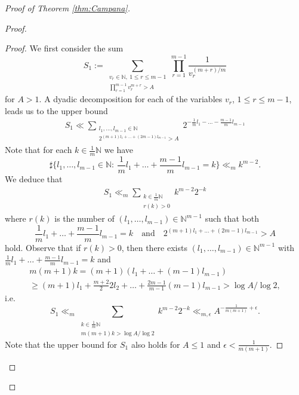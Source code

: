 \documentclass[10pt, a4paper, reqno, english]{amsart}
\theoremstyle{definition}
\numberwithin{theorem}{section}
\numberwithin{equation}{section}
\begin{document}
\begin{proof}[Proof of Theorem \ref{thm:Campana}]
\begin{proof}
\begin{proof}
We first consider the sum
$$S_1:=  \sum_{\substack{ v_{r}\in \mathbb{N},\ 1\leq r\leq m-1\\\prod_{r=1}^{m-1} v_{r}^{m+r}>A }} \prod_{r=1}^{m-1}\frac{1}{ v_{r}^{(m+r)/m}}$$
for $A>1$. A dyadic decomposition for each of the variables $v_r$, $1\leq r\leq m-1$, leads us to the upper bound
\begin{gather*}
S_1\ll \sum_{\substack{l_1,\ldots, l_{m-1}\in \mathbb{N}\\ 2^{(m+1)l_1+\ldots + (2m-1)l_{m-1}}>A}} 2^{-\frac{1}{m}l_1-\ldots - \frac{m-1}{m} l_{m-1}} 
\end{gather*}
Note that for each $k\in \frac{1}{m}\mathbb{N}$ we have
$$\sharp\{l_1,\ldots, l_{m-1}\in \mathbb{N}:\ \frac{1}{m}l_1+\ldots + \frac{m-1}{m} l_{m-1}=k\}\ll_m k^{m-2}.$$
We deduce that
\begin{gather*}
S_1\ll_m \sum_{\substack{k\in \frac{1}{m}\mathbb{N}\\ r(k)>0}} k^{m-2} 2^{-k} 
\end{gather*}
where $r(k)$ is the number of $(l_1,\ldots, l_{m-1})\in \mathbb{N}^{m-1}$ such that both $$\frac{1}{m}l_1+\ldots + \frac{m-1}{m} l_{m-1}=k \quad \mbox{and}\quad 2^{(m+1)l_1+\ldots + (2m-1)l_{m-1}}>A$$ hold. Observe that if $r(k)>0$, then there exists $(l_1,\ldots, l_{m-1})\in \mathbb{N}^{m-1}$ with $\frac{1}{m}l_1+\ldots + \frac{m-1}{m} l_{m-1}=k $ and
\begin{gather*}
m(m+1)k=(m+1) \left(l_1+\ldots + (m-1) l_{m-1}\right)\\  \geq (m+1) l_1+ \frac{m+2}{2} 2 l_2+\ldots + \frac{2m-1}{m-1} (m-1)l_{m-1}> \log A/\log 2,
\end{gather*}
i.e. 
$$S_1\ll_m \sum_{\substack{ k\in \frac{1}{m}\mathbb{N}\\m(m+1)k>\log A/\log 2}} k^{m-2} 2^{-k}\ll_{m,\epsilon} A^{-\frac{1}{m(m+1)}+\epsilon}.$$
Note that the upper bound for $S_1$ also holds for $A\leq1$ and $\epsilon < \frac{1}{m(m+1)}$.\par


\end{proof}
\end{proof}
\end{proof}
\end{document}
